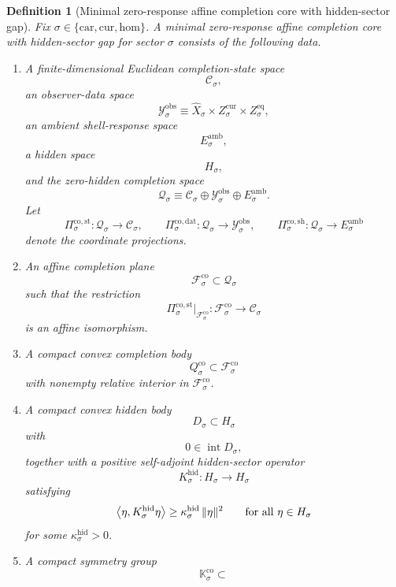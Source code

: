 \documentclass[11pt]{article}
\newcommand{\Car}{\mathrm{car}}
\newcommand{\Cur}{\mathrm{cur}}
\newcommand{\Hom}{\mathrm{hom}}
\newcommand{\VisibleAffine}[1]{\widehat X_{#1}}
\newcommand{\DataSpace}[1]{\mathcal Y_{#1}^{\mathrm{obs}}}
\newcommand{\AmbientTarget}[1]{E_{#1}^{\mathrm{amb}}}
\newcommand{\GapSpace}[1]{H_{#1}}
\newcommand{\GapBody}[1]{D_{#1}}
\newcommand{\HiddenOperator}[1]{K_{#1}^{\mathrm{hid}}}
\newcommand{\CoreState}[1]{\mathcal C_{#1}}
\newcommand{\CoreSpace}[1]{\mathcal Q_{#1}}
\newcommand{\CoreAffine}[1]{\mathcal F_{#1}^{\mathrm{co}}}
\newcommand{\CoreBody}[1]{Q_{#1}^{\mathrm{co}}}
\newcommand{\CoreStateProj}[1]{\Pi_{#1}^{\mathrm{co,st}}}
\newcommand{\CoreDataProj}[1]{\Pi_{#1}^{\mathrm{co,dat}}}
\newcommand{\CoreShellProj}[1]{\Pi_{#1}^{\mathrm{co,sh}}}
\newcommand{\CoreSym}[1]{\mathbb K_{#1}^{\mathrm{co}}}
\newtheorem{definition}{Definition}
\begin{document}
\begin{definition}[Minimal zero-response affine completion core with hidden-sector gap]
\label{def:core}
Fix \(\sigma\in\{\Car,\Cur,\Hom\}\). A \emph{minimal zero-response affine completion core with hidden-sector gap} for sector \(\sigma\) consists of the following data.
\begin{enumerate}
    \item A finite-dimensional Euclidean completion-state space
    \[
    \CoreState{\sigma},
    \]
    an observer-data space
    \[
    \DataSpace{\sigma}
    \equiv
    \VisibleAffine{\sigma}\times Z_{\sigma}^{\mathrm{cur}}\times Z_{\sigma}^{\mathrm{eq}},
    \]
    an ambient shell-response space
    \[
    \AmbientTarget{\sigma},
    \]
    a hidden space
    \[
    \GapSpace{\sigma},
    \]
    and the zero-hidden completion space
    \[
    \CoreSpace{\sigma}
    \equiv
    \CoreState{\sigma}\oplus\DataSpace{\sigma}\oplus \AmbientTarget{\sigma}.
    \]
    Let
    \[
    \CoreStateProj{\sigma}:\CoreSpace{\sigma}\to \CoreState{\sigma},
    \qquad
    \CoreDataProj{\sigma}:\CoreSpace{\sigma}\to \DataSpace{\sigma},
    \qquad
    \CoreShellProj{\sigma}:\CoreSpace{\sigma}\to \AmbientTarget{\sigma}
    \]
    denote the coordinate projections.
    \item An affine completion plane
    \[
    \CoreAffine{\sigma}\subset \CoreSpace{\sigma}
    \]
    such that the restriction
    \[
    \CoreStateProj{\sigma}\big|_{\CoreAffine{\sigma}}:
    \CoreAffine{\sigma}\to \CoreState{\sigma}
    \]
    is an affine isomorphism.
    \item A compact convex completion body
    \[
    \CoreBody{\sigma}\subset \CoreAffine{\sigma}
    \]
    with nonempty relative interior in \(\CoreAffine{\sigma}\).
    \item A compact convex hidden body
    \[
    \GapBody{\sigma}\subset \GapSpace{\sigma}
    \]
    with
    \[
    0\in\operatorname{int}\GapBody{\sigma},
    \]
    together with a positive self-adjoint hidden-sector operator
    \[
    \HiddenOperator{\sigma}:\GapSpace{\sigma}\to\GapSpace{\sigma}
    \]
    satisfying
    \begin{equation}
    \ev{\eta,\HiddenOperator{\sigma}\eta}
    \ge
    \kappa_{\sigma}^{\mathrm{hid}}\,
    \|\eta\|^{2}
    \qquad
    \text{for all }\eta\in\GapSpace{\sigma}
    \label{eq:coregap}
    \end{equation}
    for some \(\kappa_{\sigma}^{\mathrm{hid}}>0\).
    \item A compact symmetry group
    \[
    \CoreSym{\sigma}\subset
\]
\end{enumerate}
\end{definition}
\end{document}

